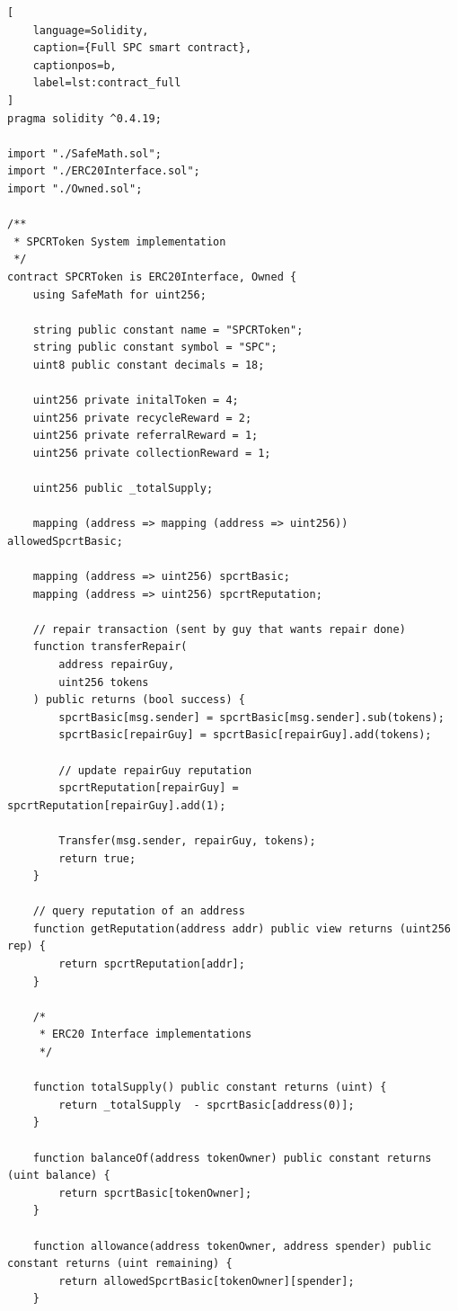 \documentclass[11pt]{scrartcl}
\begin{document}
\begin{lstlisting}[
    language=Solidity,
    caption={Full SPC smart contract},
    captionpos=b,
    label=lst:contract_full
]
pragma solidity ^0.4.19;

import "./SafeMath.sol";
import "./ERC20Interface.sol";
import "./Owned.sol";

/**
 * SPCRToken System implementation
 */
contract SPCRToken is ERC20Interface, Owned {
    using SafeMath for uint256;

    string public constant name = "SPCRToken";
    string public constant symbol = "SPC";
    uint8 public constant decimals = 18;

    uint256 private initalToken = 4;
    uint256 private recycleReward = 2;
    uint256 private referralReward = 1;
    uint256 private collectionReward = 1;

    uint256 public _totalSupply;

    mapping (address => mapping (address => uint256)) allowedSpcrtBasic;

    mapping (address => uint256) spcrtBasic;
    mapping (address => uint256) spcrtReputation;

    // repair transaction (sent by guy that wants repair done)
    function transferRepair(
        address repairGuy,
        uint256 tokens
    ) public returns (bool success) {
        spcrtBasic[msg.sender] = spcrtBasic[msg.sender].sub(tokens);
        spcrtBasic[repairGuy] = spcrtBasic[repairGuy].add(tokens);

        // update repairGuy reputation
        spcrtReputation[repairGuy] = spcrtReputation[repairGuy].add(1);

        Transfer(msg.sender, repairGuy, tokens);
        return true;
    }

    // query reputation of an address
    function getReputation(address addr) public view returns (uint256 rep) {
        return spcrtReputation[addr];
    }

    /*
     * ERC20 Interface implementations
     */

    function totalSupply() public constant returns (uint) {
        return _totalSupply  - spcrtBasic[address(0)];
    }

    function balanceOf(address tokenOwner) public constant returns (uint balance) {
        return spcrtBasic[tokenOwner];
    }

    function allowance(address tokenOwner, address spender) public constant returns (uint remaining) {
        return allowedSpcrtBasic[tokenOwner][spender];
    }


\end{lstlisting}
\end{document}
